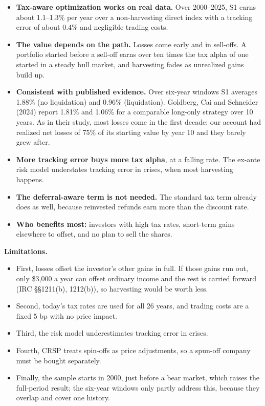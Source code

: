 \documentclass[
  11pt,
]{article}
\providecommand{\tightlist}{%
  \setlength{\itemsep}{0pt}\setlength{\parskip}{0pt}}
\begin{document}
\begin{itemize}
\tightlist
\item
  \textbf{Tax-aware optimization works on real data.} Over 2000--2025, S1 earns about 1.1--1.3\% per year over a non-harvesting direct index with a tracking error of about 0.4\% and negligible trading costs.
\item
  \textbf{The value depends on the path.} Losses come early and in sell-offs. A portfolio started before a sell-off earns over ten times the tax alpha of one started in a steady bull market, and harvesting fades as unrealized gains build up.
\item
  \textbf{Consistent with published evidence.} Over six-year windows S1 averages 1.88\% (no liquidation) and 0.96\% (liquidation). Goldberg, Cai and Schneider (2024) report 1.81\% and 1.06\% for a comparable long-only strategy over 10 years. As in
  their study, most losses come in the first decade: our account had realized net losses of 75\% of its starting value by year 10 and they barely grew after.
\item
  \textbf{More tracking error buys more tax alpha}, at a falling rate. The ex-ante risk model understates tracking error in crises, when most harvesting happens.
\item
  \textbf{The deferral-aware term is not needed.} The standard tax term already does as well, because reinvested refunds earn more than the discount rate.
\item
  \textbf{Who benefits most:} investors with high tax rates, short-term gains elsewhere to offset, and no plan to sell the shares.
\end{itemize}

\textbf{Limitations.}

\begin{itemize}
\tightlist
\item
  First, losses offset the investor's other gains in full. If those gains run out, only \$3,000 a year can offset ordinary income and the rest is carried forward (IRC §§1211(b), 1212(b)), so harvesting would be worth less.
\item
  Second, today's tax rates are used for all 26 years, and trading costs are a fixed 5 bp with no price impact.
\item
  Third, the risk model underestimates tracking error in crises.
\item
  Fourth, CRSP treats spin-offs as price adjustments, so a spun-off company must be bought separately.
\item
  Finally, the sample starts in 2000, just before a bear market, which raises the full-period result; the six-year windows only partly address this, because they overlap and cover one history.
\end{itemize}
\end{document}
